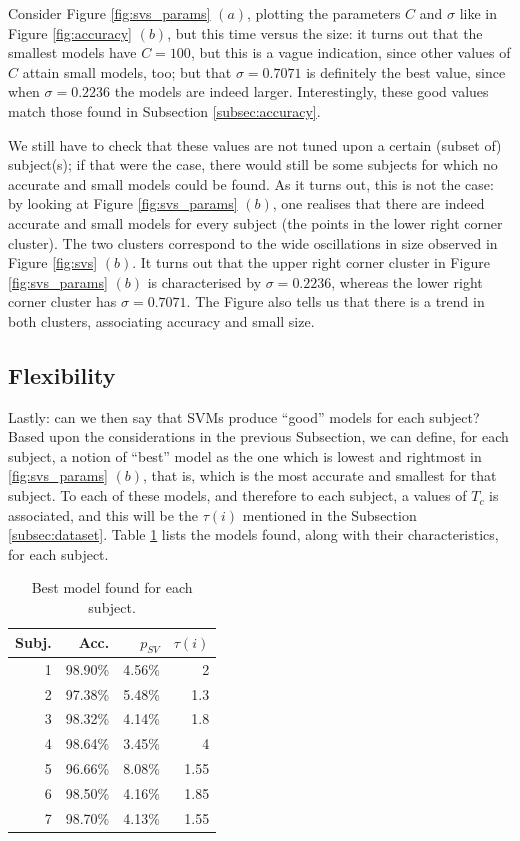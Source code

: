 \documentclass{article}
\begin{document}
Consider Figure \ref{fig:svs_params} $(a)$, plotting the parameters
$C$ and $\sigma$ like in Figure \ref{fig:accuracy} $(b)$, but this
time versus the size: it turns out that the smallest models have
$C=100$, but this is a vague indication, since other values of $C$
attain small models, too; but that $\sigma=0.7071$ is definitely the
best value, since when $\sigma=0.2236$ the models are indeed
larger. Interestingly, these good values match those found in
Subsection \ref{subsec:accuracy}.

We still have to check that these values are not tuned upon a certain
(subset of) subject(s); if that were the case, there would still be
some subjects for which no accurate and small models could be
found. As it turns out, this is not the case: by looking at Figure
\ref{fig:svs_params} $(b)$, one realises that there are indeed
accurate and small models for every subject (the points in the lower
right corner cluster). The two clusters correspond to the wide
oscillations in size observed in Figure \ref{fig:svs} $(b)$. It turns
out that the upper right corner cluster in Figure \ref{fig:svs_params}
$(b)$ is characterised by $\sigma=0.2236$, whereas the lower right
corner cluster has $\sigma=0.7071$. The Figure also tells us that
there is a trend in both clusters, associating accuracy and small
size.

\subsection{Flexibility}

Lastly: can we then say that SVMs produce ``good'' models for each
subject? Based upon the considerations in the previous Subsection, we
can define, for each subject, a notion of ``best'' model as the one
which is lowest and rightmost in \ref{fig:svs_params} $(b)$, that is,
which is the most accurate and smallest for that subject. To each of
these models, and therefore to each subject, a values of $T_c$ is
associated, and this will be the $\tau(i)$ mentioned in the Subsection
\ref{subsec:dataset}. Table \ref{tab:tau} lists the models found,
along with their characteristics, for each subject.

\begin{table}[!t]
  \centering
    \caption{Best model found for each subject.}
    \begin{tabular}{|r|r|r|r|}
      \hline
      Subj. & Acc. & $p_{SV}$ & $\tau(i)$ \\
      \hline
      1 & 98.90\% & 4.56\% & 2   \\
      2 & 97.38\% & 5.48\% & 1.3 \\
      3 & 98.32\% & 4.14\% & 1.8 \\
      4 & 98.64\% & 3.45\% & 4   \\
      5 & 96.66\% & 8.08\% & 1.55\\
      6 & 98.50\% & 4.16\% & 1.85\\
      7 & 98.70\% & 4.13\% & 1.55\\
      \hline
    \end{tabular}
    \label{tab:tau}
\end{table}
\end{document}
